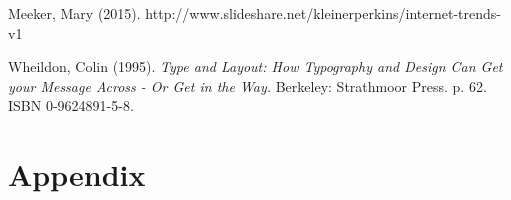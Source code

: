 \documentclass[titlepage]{report}
\begin{document}
\begin{thebibliography}{1}

	 Meeker, Mary (2015). http://www.slideshare.net/kleinerperkins/internet-trends-v1

     Wheildon, Colin (1995). \emph{Type and Layout: How Typography and Design Can Get your Message Across - Or Get in the Way.} Berkeley: Strathmoor Press. p. 62. ISBN 0-9624891-5-8.

\end{thebibliography}


\clearpage
\section*{Appendix}
\end{document}
